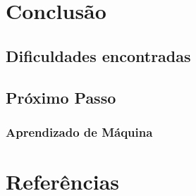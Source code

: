 \documentclass[11pt]{report}
\begin{document}
\pagebreak
\chapter{Conclusão}
\section{Dificuldades encontradas}
\section{Próximo Passo}
\subsection{Aprendizado de Máquina}

\pagebreak
\chapter*{Referências}
\end{document}
